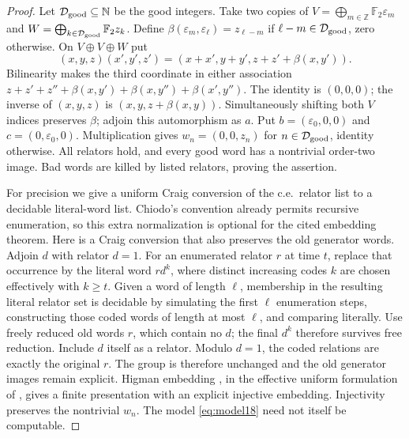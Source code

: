 \begin{proof}
Let $\mathcal D_{\rm good}\subseteq\mathbb N$ be the good integers.
Take two copies of $V=\bigoplus_{m\in\mathbb Z}\mathbb F_2\varepsilon_m$ and
$W=\bigoplus_{k\in\mathcal D_{\rm good}}\mathbb F_2z_k$.
Define $\beta(\varepsilon_m,\varepsilon_\ell)=z_{\ell-m}$ if $\ell-m\in\mathcal D_{\rm good}$, zero otherwise.
On $V\oplus V\oplus W$ put
\begin{equation}\label{eq:model18}
 (x,y,z)(x',y',z')=(x+x',y+y',z+z'+\beta(x,y')).
\end{equation}
Bilinearity makes the third coordinate in either association
$z+z'+z''+\beta(x,y')+\beta(x,y'')+\beta(x',y'')$.
The identity is $(0,0,0)$; the inverse of $(x,y,z)$ is
$(x,y,z+\beta(x,y))$.
Simultaneously shifting both $V$ indices preserves $\beta$; adjoin
this automorphism as $a$. Put $b=(\varepsilon_0,0,0)$ and $c=(0,\varepsilon_0,0)$.
Multiplication gives $w_n=(0,0,z_n)$ for $n\in\mathcal D_{\rm good}$, identity otherwise.
All relators hold, and every good word has a nontrivial order-two image.
Bad words are killed by listed relators, proving the assertion.

For precision we give a uniform Craig conversion \cite{Craig} of the c.e.\
relator list to a decidable literal-word list. Chiodo's convention
already permits recursive enumeration, so this extra normalization
is optional for the cited embedding theorem. Here is a Craig conversion that
also preserves the old generator words. Adjoin $d$ with relator $d=1$.
For an enumerated relator $r$ at time $t$, replace that occurrence
by the literal word $r d^k$, where distinct increasing codes
$k$ are chosen effectively with $k\geq t$. Given a word of length
$\ell$, membership in the resulting literal relator set is decidable
by simulating the first $\ell$ enumeration steps, constructing those
coded words of length at most $\ell$, and comparing literally.
Use freely reduced old words $r$, which contain no $d$; the final
$d^k$ therefore survives free reduction. Include $d$ itself as a
relator. Modulo $d=1$, the coded relations are exactly the original $r$.
The group is therefore unchanged and the old generator images remain
explicit. Higman embedding \cite{Higman}, in the effective uniform formulation
of \cite[Theorem 2.2]{Chiodo}, gives a finite presentation with an explicit
injective embedding. Injectivity preserves the nontrivial $w_n$.
The model \eqref{eq:model18} need not itself be computable.
\end{proof}

